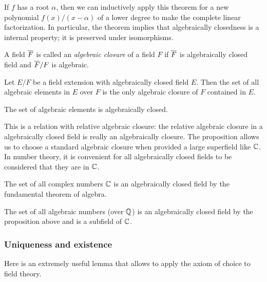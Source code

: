 \documentclass{../exp}
\begin{document}
If $f$ has a root $\alpha$, then we can inductively apply this theorem for a new polynomial $f(x)/(x-\alpha)$ of a lower degree to make the complete linear factorization.
In particular, the theorem implies that algebraically closedness is a internal property; it is preserved under isomorphisms.

\begin{defn}
A field $\overline F$ is called an \emph{algebraic closure} of a field $F$ if $\overline F$ is algebraically closed field and $\overline F/F$ is algebraic.
\end{defn}


\begin{prop}
Let $E/F$ be a field extension with algebraically closed field $E$.
Then the set of all algebraic elements in $E$ over $F$ is the only algebraic closure of $F$ contained in $E$.
\end{prop}
\begin{pf}
The set of algebraic elements is algebraically closed.
\end{pf}

This is a relation with relative algebraic closure: the relative algebraic closure in a algebraically closed field is really an algebraically closure.
The proposition allows us to choose a standard algebraic closure when provided a large superfield like $\mathbb{C}$.
In number theory, it is convenient for all algebraically closed fields to be considered that they are in $\mathbb{C}$. 

\begin{ex}
The set of all complex numbers $\mathbb{C}$ is an algebraically closed field by the fundamental theorem of algebra.
\end{ex}
\begin{ex}
The set of all algebraic numbers (over $\mathbb{Q}$) is an algebraically closed field by the proposition above and is a subfield of $\mathbb{C}$.
\end{ex}

\subsubsection{Uniqueness and existence}
Here is an extremely useful lemma that allows to apply the axiom of choice to field theory.
\end{document}
